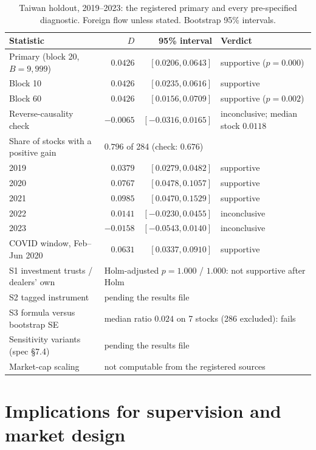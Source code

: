 \begin{table}[htbp]\centering\small
\caption{Taiwan holdout, 2019--2023: the registered primary and every pre-specified diagnostic. Foreign flow unless stated. Bootstrap 95\% intervals.}\label{tab:taiwan}
\begin{tabular}{lrrl}
\toprule
Statistic & $D$ & 95\% interval & Verdict\\
\midrule
Primary (block 20, $B=9{,}999$) & $0.0426$ & $[0.0206, 0.0643]$ & supportive ($p=0.000$)\\
Block 10 & $0.0426$ & $[0.0235, 0.0616]$ & supportive\\
Block 60 & $0.0426$ & $[0.0156, 0.0709]$ & supportive ($p=0.002$)\\
Reverse-causality check & $-0.0065$ & $[-0.0316, 0.0165]$ & inconclusive; median stock $0.0118$\\
Share of stocks with a positive gain & \multicolumn{3}{l}{$0.796$ of 284 (check: $0.676$)}\\
2019 & $0.0379$ & $[0.0279, 0.0482]$ & supportive\\
2020 & $0.0767$ & $[0.0478, 0.1057]$ & supportive\\
2021 & $0.0985$ & $[0.0470, 0.1529]$ & supportive\\
2022 & $0.0141$ & $[-0.0230, 0.0455]$ & inconclusive\\
2023 & $-0.0158$ & $[-0.0543, 0.0140]$ & inconclusive\\
COVID window, Feb--Jun 2020 & $0.0631$ & $[0.0337, 0.0910]$ & supportive\\
S1 investment trusts / dealers' own & \multicolumn{3}{l}{Holm-adjusted $p=1.000$ / $1.000$: not supportive after Holm}\\
S2 tagged instrument & \multicolumn{3}{l}{pending the results file}\\
S3 formula versus bootstrap SE & \multicolumn{3}{l}{median ratio $0.024$ on 7 stocks (286 excluded): fails}\\
Sensitivity variants (spec \S7.4) & \multicolumn{3}{l}{pending the results file}\\
Market-cap scaling & \multicolumn{3}{l}{not computable from the registered sources}\\
\bottomrule
\end{tabular}
\end{table}

\section{Implications for supervision and market design}\label{sec:policy}

